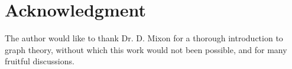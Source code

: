 \documentclass[journal]{IEEEtran}
\begin{document}
%


\appendices



\section*{Acknowledgment}


The author would like to thank Dr. D. Mixon for a thorough introduction to graph theory, without which this work would not been possible, and for many fruitful discussions.


\ifCLASSOPTIONcaptionsoff
  \newpage
\fi







%
\end{document}
